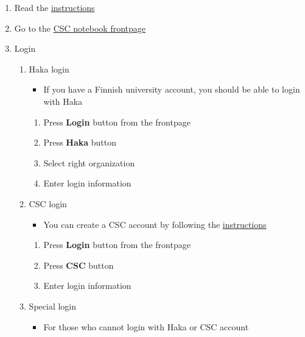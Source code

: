 \documentclass[
  oneside]{book}
\providecommand{\tightlist}{%
  \setlength{\itemsep}{0pt}\setlength{\parskip}{0pt}}
\begin{document}
\begin{enumerate}
\def\labelenumi{\arabic{enumi}.}
\tightlist
\item
  Read the \href{https://docs.csc.fi/cloud/csc_notebooks/guide_for_students/}{instructions}
\item
  Go to the \href{https://notebooks-beta.rahtiapp.fi/welcome}{CSC notebook frontpage}
\item
  Login

  \begin{enumerate}
  \def\labelenumii{\alph{enumii}.}
  \tightlist
  \item
    Haka login

    \begin{itemize}
    \tightlist
    \item
      If you have a Finnish university account, you should be able to login with Haka
    \end{itemize}

    \begin{enumerate}
    \def\labelenumiii{\arabic{enumiii}.}
    \tightlist
    \item
      Press \textbf{Login} button from the frontpage
    \item
      Press \textbf{Haka} button
    \item
      Select right organization
    \item
      Enter login information
    \end{enumerate}
  \item
    CSC login

    \begin{itemize}
    \tightlist
    \item
      You can create a CSC account by following the \href{https://research.csc.fi/accounts-and-projects}{instructions}
    \end{itemize}

    \begin{enumerate}
    \def\labelenumiii{\arabic{enumiii}.}
    \tightlist
    \item
      Press \textbf{Login} button from the frontpage
    \item
      Press \textbf{CSC} button
    \item
      Enter login information
    \end{enumerate}
  \item
    Special login

    \begin{itemize}
    \tightlist
    \item
      For those who cannot login with Haka or CSC account
    \end{itemize}


\end{enumerate}
\end{enumerate}
\end{document}
